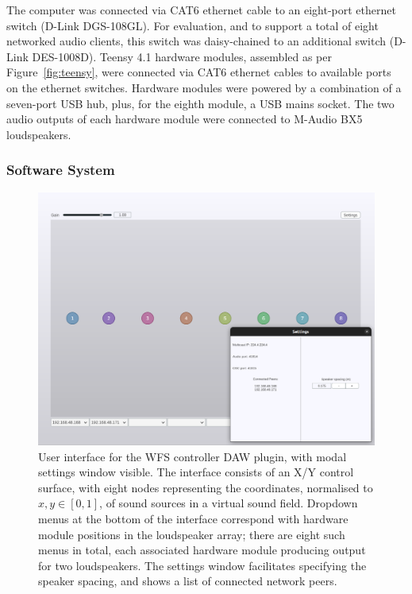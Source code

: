 \documentclass[utf8]{FrontiersinHarvard}
\newcommand{\figref}[1]{Figure~\ref{#1}}
\begin{document}
    The computer was connected via CAT6 ethernet cable to an eight-port ethernet
    switch (D-Link DGS-108GL).
    For evaluation, and to support a total of eight networked audio clients, this
    switch was daisy-chained to an additional switch (D-Link DES-1008D).
    Teensy 4.1 hardware modules, assembled as per \figref{fig:teensy}, were
    connected via CAT6 ethernet cables to available ports on the ethernet switches.
    Hardware modules were powered by a combination of a seven-port USB hub, plus,
    for the eighth module, a USB mains socket.
    The two audio outputs of each hardware module were connected to M-Audio BX5
    loudspeakers.

    \subsubsection{Software System}\label{subsubsec:software-system}

    \begin{figure}[ht]
        \centering
        \includegraphics[width=\textwidth]{figures/plugin}
        \caption{
            User interface for the WFS controller DAW plugin, with modal
            settings window visible.
            The interface consists of an X/Y control surface, with eight nodes
            representing the coordinates, normalised to $x,y \in [0,1]$, of sound
            sources in a virtual sound field.
            Dropdown menus at the bottom of the interface correspond with hardware
            module positions in the loudspeaker array; there are eight such menus
            in total, each associated hardware module producing output for two
            loudspeakers.
            The settings window facilitates specifying the speaker spacing, and
            shows a list of connected network peers.
        }
        \label{fig:plugin-interface}
    \end{figure}
\end{document}
